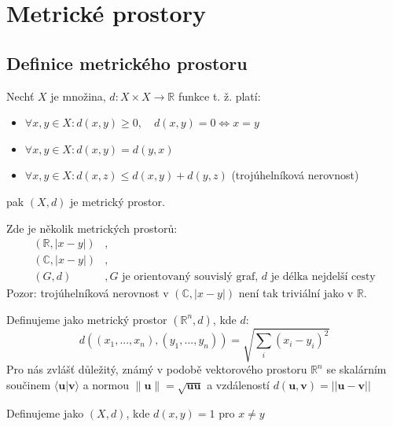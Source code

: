 \documentclass[../main.tex]{subfiles}
\begin{document}
\section{Metrické prostory}
\subsection{Definice metrického prostoru}

\begin{definition}
	Nechť $X$ je množina,  $d: X \times X \rightarrow \mathbb{R}$ funkce t. ž. platí:
	
	\begin{itemize}
	\item{$\forall x,y \in X : d(x,y) \geq 0, \quad d(x,y) = 0 \iff x = y$ }
	\item{$\forall x,y \in X : d(x,y) = d(y,x)$}
	\item{$\forall x,y \in X : d(x,z) \leq d(x,y) + d(y,z)$ (trojúhelníková nerovnost)}
	\end{itemize}
	pak $(X,d)$ je metrický prostor.
\end{definition}

\begin{example}
	Zde je několik metrických prostorů:
	\begin{align*} 
	    (\mathbb{R}, |x-y|) &,\\
	    (\mathbb{C},|x-y|) &,\\
	    (G,d) &, G \text{ je orientovaný souvislý graf, } d \text{ je délka nejdelší cesty}
	\end{align*}%
	Pozor: trojúhelníková nerovnost v $(\mathbb{C}, |x-y|)$ není tak triviální jako v $\mathbb{R}$.
\end{example}

\begin{definition}
Definujeme jako metrický prostor $(\mathbb{R}^n,d)$, kde $d$:
\[d((x_1,...,x_n),(y_1,...,y_n)) = \sqrt{\sum_i(x_i-y_i)^2}\]
Pro nás zvlášť důležitý, známý v podobě vektorového prostoru $\mathbb{R}^n$ se skalárním součinem $\langle \textbf{u} | \textbf{v} \rangle$ a normou
$\|\textbf{u}\| = \sqrt{\textbf{uu}}$ a vzdáleností $d(\textbf{u},\textbf{v}) = ||\textbf{u}-\textbf{v} ||$
\end{definition}

\begin{definition}
	Definujeme jako $(X,d)$, kde $d(x,y) = 1$ pro $x \neq y$
\end{definition}
\end{document}
